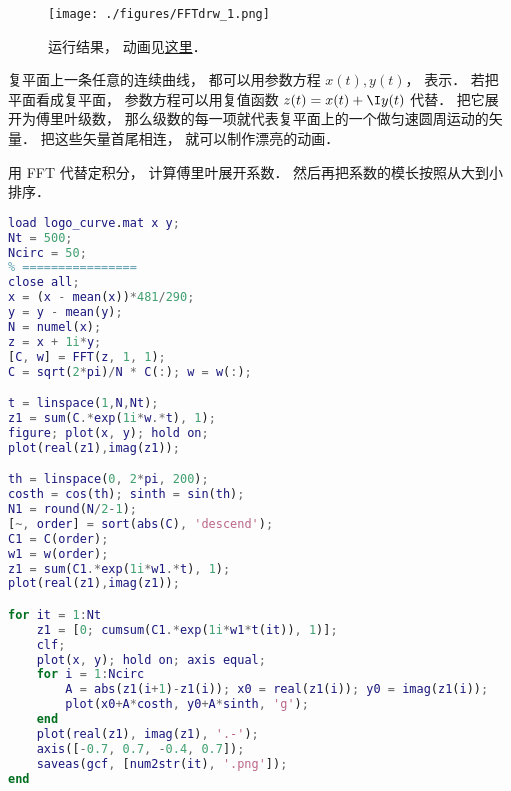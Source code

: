
\begin{issues}
\issueDraft
\end{issues}


\begin{figure}[ht]
\centering
\texttt{[image: ./figures/FFTdrw\_1.png]}
\caption{运行结果， 动画见\href{https://wuli.wiki/apps/FFTplt.html}{这里}．} \label{FFTdrw_fig1}
\end{figure}


复平面上一条任意的连续曲线， 都可以用参数方程 $x(t), y(t)$， 表示． 若把平面看成复平面， 参数方程可以用复值函数 $z(t) = x(t) + \I y(t)$ 代替． 把它展开为傅里叶级数， 那么级数的每一项就代表复平面上的一个做匀速圆周运动的矢量． 把这些矢量首尾相连， 就可以制作漂亮的动画．

用 FFT 代替定积分， 计算傅里叶展开系数． 然后再把系数的模长按照从大到小排序．

\begin{lstlisting}[language=matlab, caption=FFTplt]
% ==== 参数设置 ====
load logo_curve.mat x y;
Nt = 500;
Ncirc = 50;
% ================
close all;
x = (x - mean(x))*481/290;
y = y - mean(y);
N = numel(x);
z = x + 1i*y;
[C, w] = FFT(z, 1, 1);
C = sqrt(2*pi)/N * C(:); w = w(:);

t = linspace(1,N,Nt);
z1 = sum(C.*exp(1i*w.*t), 1);
figure; plot(x, y); hold on;
plot(real(z1),imag(z1));

th = linspace(0, 2*pi, 200);
costh = cos(th); sinth = sin(th);
N1 = round(N/2-1);
[~, order] = sort(abs(C), 'descend');
C1 = C(order);
w1 = w(order);
z1 = sum(C1.*exp(1i*w1.*t), 1);
plot(real(z1),imag(z1));

for it = 1:Nt
    z1 = [0; cumsum(C1.*exp(1i*w1*t(it)), 1)];
    clf;
    plot(x, y); hold on; axis equal;
    for i = 1:Ncirc
        A = abs(z1(i+1)-z1(i)); x0 = real(z1(i)); y0 = imag(z1(i));
        plot(x0+A*costh, y0+A*sinth, 'g');
    end
    plot(real(z1), imag(z1), '.-');
    axis([-0.7, 0.7, -0.4, 0.7]);
    saveas(gcf, [num2str(it), '.png']);
end
\end{lstlisting}
